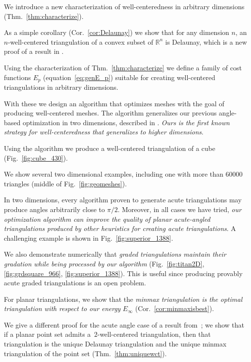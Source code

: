 \documentclass[final]{siamltex}
\newcommand{\Real}{\ensuremath{\mathbb{R}}} \newcommand{\meshM}{\ensuremath{\mathcal{M}}} \newcommand{\meshV}{\ensuremath{\mathcal{V}}} \newcommand{\meshT}{\ensuremath{\mathcal{T}}} \newcommand{\interior}{\ensuremath{\mathrm{Int}}}
\begin{document}
\begin{inparaenum}[(a)]
\item We introduce a new characterization of well-centeredness in
  arbitrary dimensions (Thm.~\ref{thm:characterize}). \item As a
  simple corollary (Cor.~\ref{cor:Delaunay}) we show that for any
  dimension $n$, an $n$-well-centered triangulation of a convex subset
  of $\Real^n$ is Delaunay, which is a new proof of a result in
  \cite{Rajan1994}.  \item Using the characterization of
  Thm.~\ref{thm:characterize} we define a family of cost functions
  $E_p$ (equation~\ref{eq:genE_p}) suitable for creating well-centered
  triangulations in arbitrary dimensions. \item With these we design
  an algorithm that optimizes meshes with the goal of producing
  well-centered meshes.  The
  algorithm generalizes our previous angle-based optimization in two
  dimensions, described in \cite{VaHiGuRa2007}.  \emph{Ours is the
    first known strategy
    for well-centeredness that generalizes to
    higher dimensions}.
\item Using the algorithm we produce a
  well-centered triangulation of a cube
  (Fig.~\ref{fig:cube_430}).
\item We show several two dimensional examples,
  including one with more than 60000 triangles
  (middle of Fig.~\ref{fig:geomeshes}).
\item  In two dimensions, every algorithm
  proven to generate acute
  triangulations may produce angles arbitrarily close to $\pi/2$.
  Moreover, in all cases we have tried, {\emph{our optimization
  algorithm can improve the quality of planar acute-angled
  triangulations produced by other heuristics for creating
  acute triangulations}}.
A challenging example is shown in
  Fig.~\ref{fig:superior_1388}.
\item We also demonstrate numerically
  that \emph{graded triangulations maintain their gradation while
    being processed by our algorithm} (Fig.~\ref{fig:titan2D},
  \ref{fig:grdsquare_966}, \ref{fig:superior_1388}). This is useful
  since producing provably acute graded triangulations is an open
  problem.
\item For planar triangulations, we show that the \emph{minmax
    triangulation \cite{EdTaWa1992} is the optimal triangulation with
    respect to our energy} $E_{\infty}$ (Cor.~\ref{cor:minmaxisbest}).
\item 
We give a different proof for the acute angle case of a result
from~\cite{BeEp1995}; we show that if a planar point set admits
a~$2$-well-centered triangulation, then that triangulation is
the unique Delaunay triangulation and
the unique minmax triangulation of the point set
(Thm.~\ref{thm:uniquewct}).
\end{inparaenum}
\end{document}
